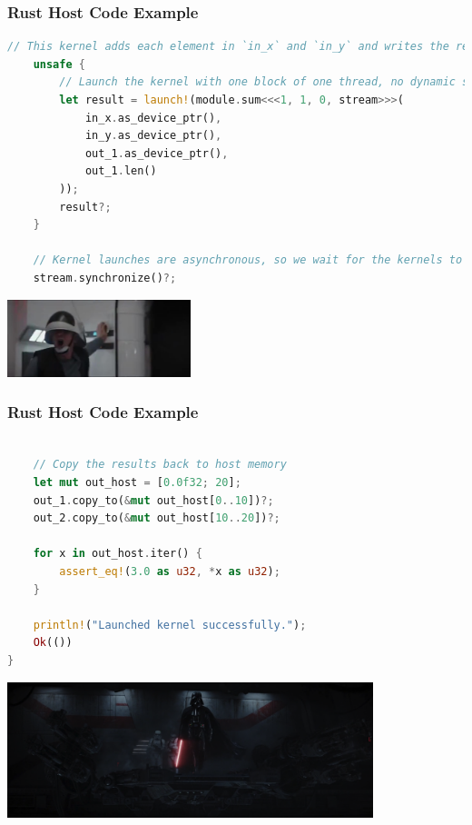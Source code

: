 \begin{frame}[fragile]
\frametitle{Rust Host Code Example}
\begin{lstlisting}[language=Rust]
    // This kernel adds each element in `in_x` and `in_y` and writes the result into `out`.
    unsafe {
        // Launch the kernel with one block of one thread, no dynamic shared memory on `stream`.
        let result = launch!(module.sum<<<1, 1, 0, stream>>>(
            in_x.as_device_ptr(),
            in_y.as_device_ptr(),
            out_1.as_device_ptr(),
            out_1.len()
        ));
        result?;
    }

    // Kernel launches are asynchronous, so we wait for the kernels to finish executing.
    stream.synchronize()?;
\end{lstlisting}

\begin{center}
	\includegraphics[width=0.4\textwidth]{images/launch-sw.jpg}
\end{center}

\end{frame}


\begin{frame}[fragile]
\frametitle{Rust Host Code Example}
\begin{lstlisting}[language=Rust]

    // Copy the results back to host memory
    let mut out_host = [0.0f32; 20];
    out_1.copy_to(&mut out_host[0..10])?;
    out_2.copy_to(&mut out_host[10..20])?;

    for x in out_host.iter() {
        assert_eq!(3.0 as u32, *x as u32);
    }

    println!("Launched kernel successfully.");
    Ok(())
}
\end{lstlisting}
\vspace{-1em}
\begin{center}
	\includegraphics[width=0.8\textwidth]{images/vader-rogue-one.png}
\end{center}

\end{frame}


